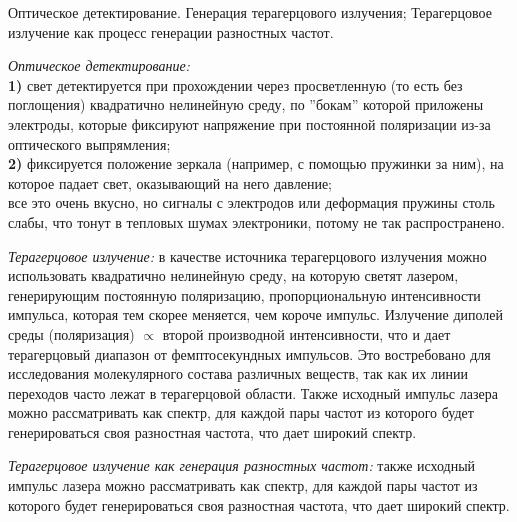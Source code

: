 
\begin{leftrules}
Оптическое детектирование. Генерация терагерцового излучения; Терагерцовое излучение как процесс генерации разностных частот.
\end{leftrules}




\textit{Оптическое детектирование:} \\
    \textbf{1)} свет детектируется при прохождении через просветленную (то есть без поглощения) квадратично нелинейную среду, по ''бокам'' которой приложены электроды, которые фиксируют напряжение при постоянной поляризации из-за оптического выпрямления; \\
    \textbf{2)} фиксируется положение зеркала (например, с помощью пружинки за ним), на которое падает свет, оказывающий на него давление; \\
    все это очень вкусно, но сигналы с электродов или деформация пружины столь слабы, что тонут в тепловых шумах электроники, потому не так распространено.


\textit{Терагерцовое излучение:} в качестве источника терагерцового излучения можно использовать квадратично нелинейную среду, на которую светят лазером, генерирующим постоянную поляризацию, пропорциональную интенсивности импульса, которая тем скорее меняется, чем короче импульс. Излучение диполей среды (поляризация) $\propto$ второй производной интенсивности, что и дает терагерцовый диапазон от фемптосекундных импульсов. Это востребовано для исследования молекулярного состава различных веществ, так как их линии переходов часто лежат в терагерцовой области. Также исходный импульс лазера можно рассматривать как спектр, для каждой пары частот из которого будет генерироваться своя разностная частота, что дает широкий спектр.


\textit{Терагерцовое излучение как генерация разностных частот:} также исходный импульс лазера можно рассматривать как спектр, для каждой пары частот из которого будет генерироваться своя разностная частота, что дает широкий спектр.
